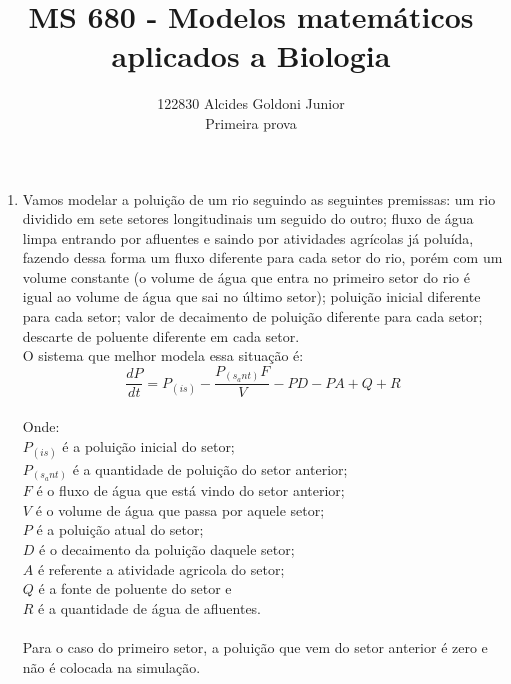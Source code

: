 \documentclass[a4paper]{article}
\title{MS 680 - Modelos matem\'{a}ticos aplicados a Biologia}
\author{122830 Alcides Goldoni Junior\\
  \Small Primeira prova \\
}%
\begin{document}
\maketitle
\begin{enumerate}
\item
Vamos modelar a polui\c{c}\~ao de um rio seguindo as seguintes premissas: um rio dividido em sete setores longitudinais um seguido do outro; fluxo de \'agua limpa entrando por afluentes e saindo por atividades agr\'icolas j\'a polu\'ida, fazendo dessa forma um fluxo diferente para cada setor do rio, por\'em com um volume constante (o volume de \'agua que entra no primeiro setor do rio \'e igual ao volume de \'agua que sai no \'ultimo setor); polui\c{c}\~ao inicial diferente para cada setor; valor de decaimento de polui\c{c}\~ao diferente para cada setor; descarte de poluente diferente em cada setor.
\\
O sistema que melhor modela essa situa\c{c}\~ao \'e:
\begin{equation}
\frac{dP}{dt} = P_(is) - \frac{P_(s_ant)F }{V} - PD - PA + Q + R
\end{equation}
\\
Onde:
\\
$P_(is)$ \'e a polui\c{c}\~ao inicial do setor;
\\
$P_(s_ant)$ \'e a quantidade de polui\c{c}\~ao do setor anterior;
\\
$F$ \'e o fluxo de \'agua que est\'a vindo do setor anterior;
\\
$V$ \'e o volume de \'agua que passa por aquele setor;
\\
$P$ \'e a polui\c{c}\~ao atual do setor;
\\
$D$ \'e o decaimento da polui\c{c}\~ao daquele setor;
\\
$A$ \'e referente a atividade agricola do setor;
\\
$Q$ \'e a fonte de poluente do setor e
\\
$R$ \'e a quantidade de \'agua de afluentes.
\\
\\
Para o caso do primeiro setor, a polui\c{c}\~ao que vem do setor anterior \'e zero e n\~ao \'e colocada na simula\c{c}\~ao.
\\


\end{enumerate}
\end{document}
